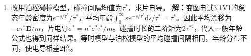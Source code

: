 \documentclass[UTF8,fontset=fandol,a4paper,11pt]{ctexart}
\begin{document}
\begin{enumerate}
\item 改用泊松碰撞模型，碰撞间隔均值为$\tau^*$，求片电导。
\textbf{解：}变图电试3.1V1的稳态年龄密度为$e^{-s/\tau^*}/\tau^*$，平均年龄$\int_0^\infty s e^{-s/\tau^*}\mathrm ds/\tau^*=\tau^*$。因此平均漂移为$-e\tau^*\boldsymbol E/m$，片电导$\sigma^*=n^*e^2\tau^*/m$。碰撞时长的二阶矩为$2\tau^{*2}$，代入一般年龄公式也得到同样结果。等时模型与泊松模型的平均碰撞间隔相同，年龄分布不同，使电导相差2倍。
\begin{center}\begin{minipage}{.98\linewidth}\centering
{}
\end{minipage}
\end{center}
\end{enumerate}
\end{document}
